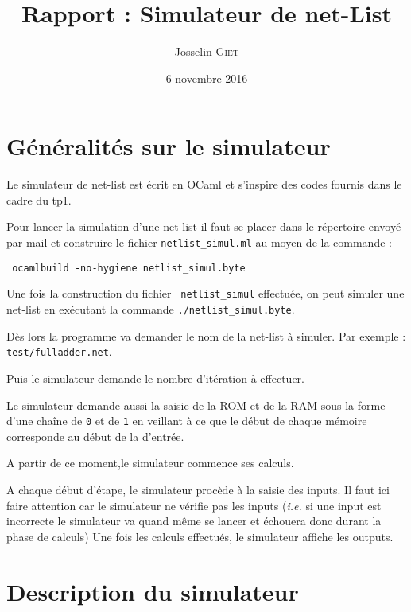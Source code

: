 \documentclass[11pt,a4paper]{article}
\title{Rapport : Simulateur de net-List}   %
\author{Josselin \textsc{Giet}}  %
\date{6 novembre 2016}    %
\newcommand{\ie}{\textit{i.e. }}
\begin{document}
\maketitle

\section{Généralités sur le simulateur}

Le simulateur de net-list est écrit en OCaml et s'inspire des codes fournis dans le cadre du tp1.

Pour lancer la simulation d'une net-list il faut se placer dans le répertoire envoyé par mail et construire le fichier \verb&netlist_simul.ml& au moyen de la commande :
\begin{center}
\verb& ocamlbuild -no-hygiene netlist_simul.byte&
\end{center}

Une fois la construction du fichier \verb& netlist_simul& effectuée, on peut simuler une net-list en exécutant la commande \verb&./netlist_simul.byte&.

Dès lors la programme va demander le nom de la net-list à simuler.
Par exemple : \verb&test/fulladder.net&.

Puis le simulateur demande le nombre d'itération à effectuer.

Le simulateur demande aussi la saisie de la ROM et de la RAM sous la forme d'une chaîne de \verb&0& et de \verb&1& en veillant à ce que le début de chaque mémoire corresponde au début de la  d'entrée.

A partir de ce moment,le simulateur commence ses calculs.

A chaque début d'étape, le simulateur procède à la saisie des inputs. 
Il faut ici faire attention car le simulateur ne vérifie pas les inputs (\ie si une input est incorrecte le simulateur va quand même se lancer et échouera donc durant la phase de calculs)
Une fois les calculs effectués, le simulateur affiche les outputs.

\section{Description du simulateur}
\end{document}
